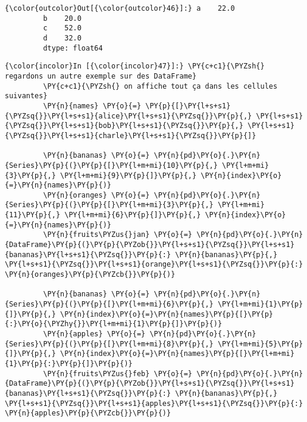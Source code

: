 \begin{Verbatim}[commandchars=\\\{\},frame=single,framerule=0.3mm,rulecolor=\color{cellframecolor}]
{\color{outcolor}Out[{\color{outcolor}46}]:} a    22.0
         b    20.0
         c    52.0
         d    32.0
         dtype: float64
\end{Verbatim}
            
    \begin{Verbatim}[commandchars=\\\{\},frame=single,framerule=0.3mm,rulecolor=\color{cellframecolor}]
{\color{incolor}In [{\color{incolor}47}]:} \PY{c+c1}{\PYZsh{} regardons un autre exemple sur des DataFrame}
         \PY{c+c1}{\PYZsh{} on affiche tout ça dans les cellules suivantes}
         \PY{n}{names} \PY{o}{=} \PY{p}{[}\PY{l+s+s1}{\PYZsq{}}\PY{l+s+s1}{alice}\PY{l+s+s1}{\PYZsq{}}\PY{p}{,} \PY{l+s+s1}{\PYZsq{}}\PY{l+s+s1}{bob}\PY{l+s+s1}{\PYZsq{}}\PY{p}{,} \PY{l+s+s1}{\PYZsq{}}\PY{l+s+s1}{charle}\PY{l+s+s1}{\PYZsq{}}\PY{p}{]}
         
         \PY{n}{bananas} \PY{o}{=} \PY{n}{pd}\PY{o}{.}\PY{n}{Series}\PY{p}{(}\PY{p}{[}\PY{l+m+mi}{10}\PY{p}{,} \PY{l+m+mi}{3}\PY{p}{,} \PY{l+m+mi}{9}\PY{p}{]}\PY{p}{,} \PY{n}{index}\PY{o}{=}\PY{n}{names}\PY{p}{)}
         \PY{n}{oranges} \PY{o}{=} \PY{n}{pd}\PY{o}{.}\PY{n}{Series}\PY{p}{(}\PY{p}{[}\PY{l+m+mi}{3}\PY{p}{,} \PY{l+m+mi}{11}\PY{p}{,} \PY{l+m+mi}{6}\PY{p}{]}\PY{p}{,} \PY{n}{index}\PY{o}{=}\PY{n}{names}\PY{p}{)}
         \PY{n}{fruits\PYZus{}jan} \PY{o}{=} \PY{n}{pd}\PY{o}{.}\PY{n}{DataFrame}\PY{p}{(}\PY{p}{\PYZob{}}\PY{l+s+s1}{\PYZsq{}}\PY{l+s+s1}{bananas}\PY{l+s+s1}{\PYZsq{}}\PY{p}{:} \PY{n}{bananas}\PY{p}{,} \PY{l+s+s1}{\PYZsq{}}\PY{l+s+s1}{orange}\PY{l+s+s1}{\PYZsq{}}\PY{p}{:} \PY{n}{oranges}\PY{p}{\PYZcb{}}\PY{p}{)}
         
         \PY{n}{bananas} \PY{o}{=} \PY{n}{pd}\PY{o}{.}\PY{n}{Series}\PY{p}{(}\PY{p}{[}\PY{l+m+mi}{6}\PY{p}{,} \PY{l+m+mi}{1}\PY{p}{]}\PY{p}{,} \PY{n}{index}\PY{o}{=}\PY{n}{names}\PY{p}{[}\PY{p}{:}\PY{o}{\PYZhy{}}\PY{l+m+mi}{1}\PY{p}{]}\PY{p}{)}
         \PY{n}{apples} \PY{o}{=} \PY{n}{pd}\PY{o}{.}\PY{n}{Series}\PY{p}{(}\PY{p}{[}\PY{l+m+mi}{8}\PY{p}{,} \PY{l+m+mi}{5}\PY{p}{]}\PY{p}{,} \PY{n}{index}\PY{o}{=}\PY{n}{names}\PY{p}{[}\PY{l+m+mi}{1}\PY{p}{:}\PY{p}{]}\PY{p}{)}
         \PY{n}{fruits\PYZus{}feb} \PY{o}{=} \PY{n}{pd}\PY{o}{.}\PY{n}{DataFrame}\PY{p}{(}\PY{p}{\PYZob{}}\PY{l+s+s1}{\PYZsq{}}\PY{l+s+s1}{bananas}\PY{l+s+s1}{\PYZsq{}}\PY{p}{:} \PY{n}{bananas}\PY{p}{,} \PY{l+s+s1}{\PYZsq{}}\PY{l+s+s1}{apples}\PY{l+s+s1}{\PYZsq{}}\PY{p}{:} \PY{n}{apples}\PY{p}{\PYZcb{}}\PY{p}{)}
\end{Verbatim}



